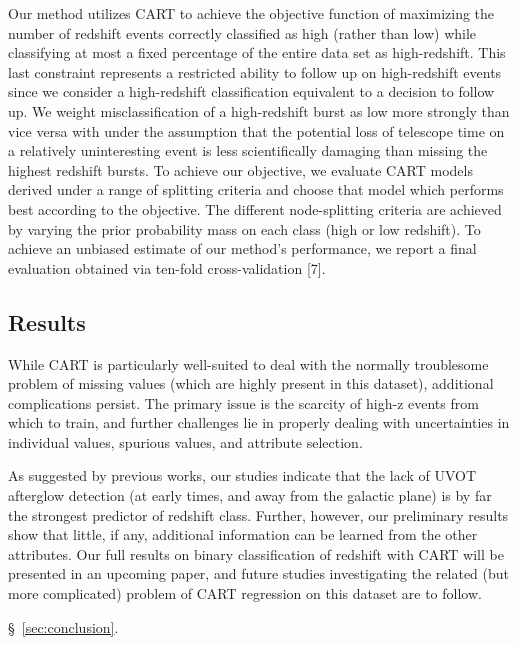 \documentclass[12pt,preprint]{aastex}
\begin{document}
Our method utilizes CART to achieve the objective function of maximizing the 
number of redshift events correctly classified as high (rather than low) while
classifying at most a fixed percentage of the entire data set as 
high-redshift. This last constraint represents a restricted ability to follow 
up on high-redshift events since we consider a high-redshift classification 
equivalent to a decision to follow up.  We weight misclassification of a 
high-redshift burst as low more strongly than vice versa with under the 
assumption that the potential loss of telescope time on a relatively 
uninteresting event is less scientifically damaging than missing the highest 
redshift bursts. To achieve our objective, we evaluate CART models derived 
under a range of splitting criteria and choose that model which performs best 
according to the objective. The different node-splitting criteria are achieved
by varying the prior probability mass on each class (high or low redshift).  
To achieve an unbiased estimate of our method's performance, we report a final
evaluation obtained via ten-fold cross-validation [7].


\subsection{Results}
\label{sec:models:some}

While CART is particularly well-suited to deal with the normally troublesome 
problem of missing values (which are highly present in this dataset), 
additional complications persist.  The primary issue is the scarcity of high-z 
events from which to train, and further challenges lie in properly dealing 
with uncertainties in individual values, spurious values, and attribute 
selection.

As suggested by previous works, our studies indicate that the lack of UVOT 
afterglow detection (at early times, and away from the galactic plane) is by 
far the strongest predictor of redshift class.  Further, however, our 
preliminary results show that little, if any, additional information can be 
learned from the other attributes.  Our full results  on binary classification 
of redshift with CART will be presented in an upcoming paper, and future 
studies investigating the related (but more complicated) problem of CART 
regression on this dataset are to follow.



\S~\ref{sec:conclusion}.
\end{document}
